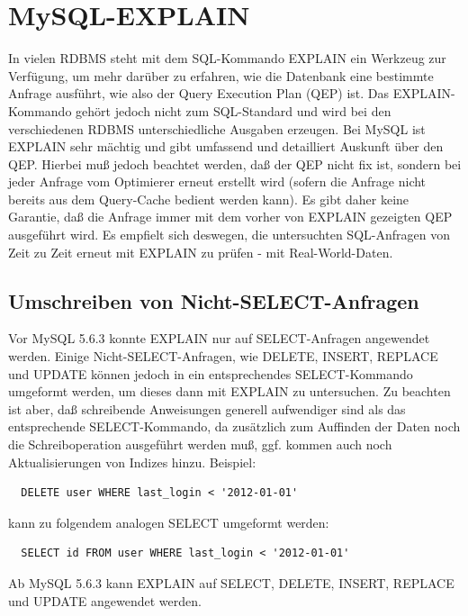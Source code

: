 \section{MySQL-EXPLAIN}
In vielen RDBMS steht mit dem SQL-Kommando EXPLAIN ein Werkzeug zur Verfügung, um mehr darüber zu erfahren, wie die Datenbank eine bestimmte Anfrage ausführt, wie also der Query Execution Plan (QEP) ist. Das EXPLAIN-Kommando gehört jedoch nicht zum SQL-Standard und wird bei den verschiedenen RDBMS unterschiedliche Ausgaben erzeugen. Bei MySQL ist EXPLAIN sehr mächtig und gibt umfassend und detailliert Auskunft über den QEP. Hierbei muß jedoch beachtet werden, daß der QEP nicht fix ist, sondern bei jeder Anfrage vom Optimierer erneut erstellt wird (sofern die Anfrage nicht bereits aus dem Query-Cache bedient werden kann). Es gibt daher keine Garantie, daß die Anfrage immer mit dem vorher von EXPLAIN gezeigten QEP ausgeführt wird. Es empfielt sich deswegen, die untersuchten SQL-Anfragen von Zeit zu Zeit erneut mit EXPLAIN zu prüfen - mit Real-World-Daten.

\subsection{Umschreiben von Nicht-SELECT-Anfragen}
Vor MySQL 5.6.3 konnte EXPLAIN nur auf SELECT-Anfragen angewendet werden. \cite{refman3}
Einige Nicht-SELECT-Anfragen, wie DELETE, INSERT, REPLACE und UPDATE können jedoch in ein entsprechendes SELECT-Kommando umgeformt werden, um dieses dann mit EXPLAIN zu untersuchen. Zu beachten ist aber, daß schreibende Anweisungen generell aufwendiger sind als das entsprechende SELECT-Kommando, da zusätzlich zum Auffinden der Daten noch die Schreiboperation ausgeführt werden muß, ggf. kommen auch noch Aktualisierungen von Indizes hinzu.
Beispiel:
\begin{lstlisting}
  DELETE user WHERE last_login < '2012-01-01'
\end{lstlisting}
kann zu folgendem analogen SELECT umgeformt werden:
\begin{lstlisting}
  SELECT id FROM user WHERE last_login < '2012-01-01'
\end{lstlisting}
Ab MySQL 5.6.3 kann EXPLAIN auf SELECT, DELETE, INSERT, REPLACE und UPDATE angewendet werden.\cite{refman3}

